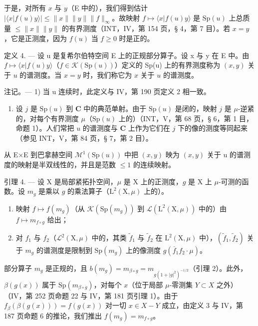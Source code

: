 于是，对所有 \(x\) 与 \(y\)（E 中的），我们得到估计 \(|\langle x | f(u)y\rangle| \leqslant \|x\|\|y\|\|f\|_{\infty}\)。故映射 \(f \mapsto \langle x | f(u)y\rangle\) 是 \(\mathrm{Sp}(u)\) 上总质量 \(\leqslant \|x\|\|y\|\) 的有界测度（INT，IV，第 154 页，§ 4，第 7 目）。若 \(x = y\)，它是正测度，因为 \(f(u)\) 当 \(f \geqslant 0\) 时是正的。

定义 4. --- 设 u 是复希尔伯特空间 E 上的正规部分算子。设 x 与 y 在 E 中。由 \(f \mapsto \langle x | f(u)y \rangle\)（\(f \in \mathcal{K}(\mathrm{Sp}(u))\)）定义的 Sp(u) 上的有界测度称为 \((x,y)\) 关于 \(u\) 的谱测度。当 \(x = y\) 时，我们称它为 \(x\) 关于 \(u\) 的谱测度。

注记。--- 1) 当 u 连续时，此定义与 IV，第 190 页定义 2 相一致。

\begin{enumerate}
\def\labelenumi{\arabic{enumi})}
\setcounter{enumi}{1}
\tightlist
\item
  设 \(j\) 是 \(\mathrm{Sp}(u)\) 到 \(\mathbf{C}\) 中的典范单射。由于 \(\mathrm{Sp}(u)\) 是闭的，映射 \(j\) 是 \(\mu\)-逆紧的，对每个有界测度 \(\mu\)（\(\mathrm{Sp}(u)\) 上的）（INT，V，第 68 页，§ 6，第 1 目，命题 1）。人们常把 \(u\) 的谱测度与 \(\mathbf{C}\) 上作为它们在 \(j\) 下的像的测度等同起来（参见 INT，V，第 84 页，§ 7，第 2 目）。
\end{enumerate}

从 E×E 到巴拿赫空间 \(\mathcal{M}^{1}(\mathrm{Sp}(u))\) 中把 \((x,y)\) 映为 \((x,y)\) 关于 u 的谱测度的映射是半双线性的，并且是范数 \(\leqslant 1\) 的连续映射。

引理 4. --- 设 X 是局部紧拓扑空间，\(\mu\) 是 X 上的正测度，\(g\) 是 X 上 \(\mu\)-可测的函数。设 \(m_g\) 是乘以 \(g\) 的乘法算子（\(\mathrm{L}^2 (\mathrm{X},\mu)\) 上的）。

\begin{enumerate}
\def\labelenumi{\alph{enumi})}
\item
  映射 \(f\mapsto f(m_{g})\)（从 \(\mathcal{K}(\mathrm{Sp}(m_g))\) 到 \(\mathcal{L}(\mathrm{L}^{2}(\mathrm{X},\mu))\) 中的）由 \(f\mapsto m_{f\circ g}\) 给出；
\item
  对 \(f_1\) 与 \(f_2\)（\(\mathcal{L}^2(\mathrm{X},\mu)\) 中的，其类 \(\widetilde{f}_1\) 与 \(\widetilde{f}_2\) 在 \(\mathrm{L}^2(\mathrm{X},\mu)\) 中），\((\widetilde{f}_1,\widetilde{f}_2)\) 关于 \(m_g\) 的谱测度是限制到 \(\mathrm{Sp}(m_g)\) 上的像测度 \(g(\overline{f}_1f_2\cdot \mu)\)。
\end{enumerate}

部分算子 \(m_g\) 是正规的，且 \(b(m_g) = m_{\beta \circ g} = m_{g(1+|g|^2)^{-1/2}}\)（引理 2）。此外，\(\beta(g(x))\) 属于 \(\mathrm{Sp}(m_{\beta \circ g})\)，对每个 \(x\)（位于局部 \(\mu\)-零测集 \(Y \subset X\) 之外）（IV，第 252 页命题 22 与 IV，第 181 页引理 1）。由于 \(f_\beta(\beta(g(x))) = f(g(x))\) 对一切 \(x \in X - Y\) 成立，由定义 3 与 IV，第 187 页命题 6 的推论，我们推出 \(f(m_g) = m_{f \circ g}\)。

